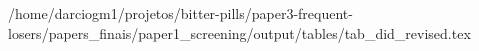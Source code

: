 /home/darciogm1/projetos/bitter-pills/paper3-frequent-losers/papers_finais/paper1_screening/output/tables/tab_did_revised.tex